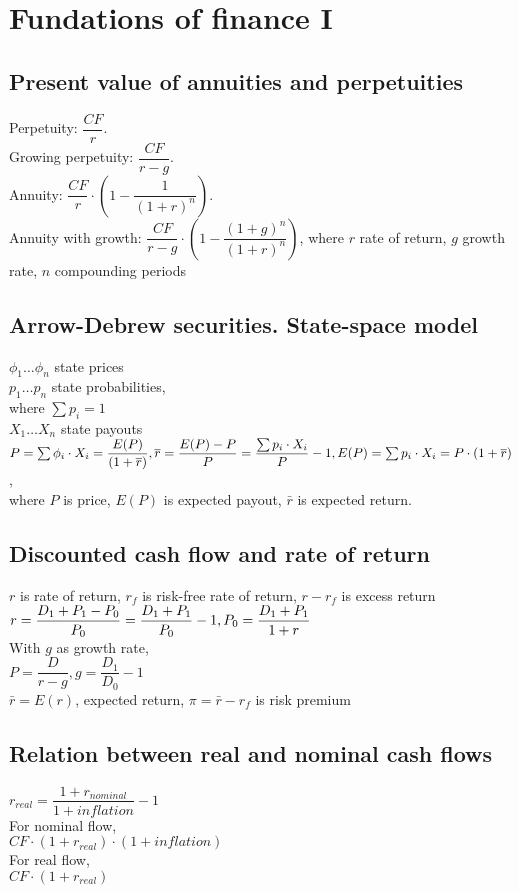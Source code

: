 \section{Fundations of finance I}
\subsection*{Present value of annuities and perpetuities}
Perpetuity: $\dfrac{CF}{r}$. \\ Growing perpetuity: $\dfrac{CF}{r -g}$. \\ Annuity: $\dfrac{CF}{r}\cdot\left(1-\dfrac{1}{(1+r)^n}\right)$. \\ Annuity with growth: $\dfrac{CF}{r-g}\cdot\left(1 - \dfrac{(1+g)^n}{(1+r)^n}\right)$, where $r$ rate of return, $g$ growth rate, $n$ compounding periods
\subsection*{Arrow-Debrew securities. State-space model}
$\phi_1\dots\phi_n$ state prices \\
$p_1\dots p_n$ state probabilities, \\ where $\sum p_i = 1$ \\
$X_1\dots X_n$ state payouts \\
$P = \sum\phi_i\cdot X_i  = \dfrac{E(P)}{(1+\bar{r})}, \\ \bar{r} = \dfrac{E(P) - P}{P} = \dfrac{\sum p_i \cdot X_i}{P} - 1, \\ E(P) = \sum p_i \cdot X_i = P\cdot(1+\bar{r})$, \\ where $P$ is price, $E(P)$ is expected payout, $\bar{r}$ is expected return.
\subsection*{Discounted cash flow and rate of return}
$r$ is rate of return, $r_f$ is risk-free rate of return, $r - r_f$ is excess return \\
$ r = \dfrac{D_1 + P_1 - P_0}{P_0} = \dfrac{D_1 + P_1}{P_0} - 1, \\ P_0 = \dfrac{D_1+P_1}{1+r}$ \\
With $g$ as growth rate, \\ $P=\dfrac{D}{r-g}, g=\dfrac{D_1}{D_0} - 1$ \\
$\bar{r}=E(r)$, expected return, $\pi = \bar{r} - r_f$ is risk premium
\subsection*{Relation between real and nominal cash flows}
$r_{real}=\dfrac{1+r_{nominal}}{1+inflation} - 1$ \\
For nominal flow,\\ $CF\cdot(1+r_{real})\cdot(1+inflation)$ \\
For real flow, \\ $CF\cdot(1+r_{real})$
